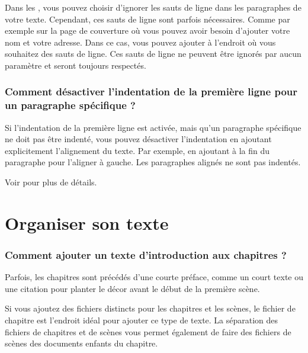 \documentclass[a4paper,11pt,french]{sphinxmanual}
\begin{document}
\sphinxAtStartPar
Dans les , vous pouvez choisir d’ignorer les sauts de ligne dans les paragraphes de votre texte. Cependant, ces sauts de ligne sont parfois nécessaires. Comme par exemple sur la page de couverture où vous pouvez avoir besoin d’ajouter votre nom et votre adresse. Dans ce cas, vous pouvez ajouter \sphinxcode{\sphinxupquote{{[}br{]}}} à l’endroit où vous souhaitez des sauts de ligne. Ces sauts de ligne ne peuvent être ignorés par aucun paramètre et seront toujours respectés.

\sphinxAtStartPar
{}
\subsubsection*{Comment désactiver l’indentation de la première ligne pour un paragraphe spécifique ?}

\sphinxAtStartPar
Si l’indentation de la première ligne est activée, mais qu’un paragraphe spécifique ne doit pas être indenté, vous pouvez désactiver l’indentation en ajoutant explicitement l’alignement du texte. Par exemple, en ajoutant \sphinxcode{\sphinxupquote{\textless{}\textless{}}} à la fin du paragraphe pour l’aligner à gauche. Les paragraphes alignés ne sont pas indentés.

\sphinxAtStartPar
Voir {\hyperref[\detokenize{usage_format:a-fmt-align}]{}} pour plus de détails.


\section{Organiser son texte}
\label{\detokenize{int_howto:organising-your-text}}\subsubsection*{Comment ajouter un texte d’introduction aux chapitres ?}

\sphinxAtStartPar
Parfois, les chapitres sont précédés d’une courte préface, comme un court texte ou une citation pour planter le décor avant le début de la première scène.

\sphinxAtStartPar
Si vous ajoutez des fichiers distincts pour les chapitres et les scènes, le fichier de chapitre est l’endroit idéal pour ajouter ce type de texte. La séparation des fichiers de chapitres et de scènes vous permet également de faire des fichiers de scènes des documents enfants du chapitre.
\end{document}
